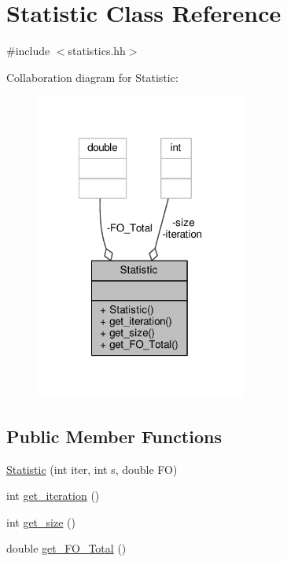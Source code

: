 \hypertarget{classStatistic}{\section{Statistic Class Reference}
\label{classStatistic}
}


{\ttfamily \#include $<$statistics.\-hh$>$}



Collaboration diagram for Statistic\-:
\nopagebreak
\begin{figure}[H]
\begin{center}
\leavevmode
\includegraphics[width=197pt]{classStatistic__coll__graph}
\end{center}
\end{figure}
\subsection*{Public Member Functions}
\begin{DoxyCompactItemize}
\item 
\hyperlink{classStatistic_a26751917fec693e54f53ddd82bdcfeb6}{Statistic} (int iter, int s, double F\-O)
\item 
int \hyperlink{classStatistic_aa2c0c56373ccda1863f581eac24413b3}{get\-\_\-iteration} ()
\item 
int \hyperlink{classStatistic_ad28210c1a4d8682ab13780b47d415a6b}{get\-\_\-size} ()
\item 
double \hyperlink{classStatistic_a6a336f89725583229d34ba270af85be0}{get\-\_\-\-F\-O\-\_\-\-Total} ()
\end{DoxyCompactItemize}
